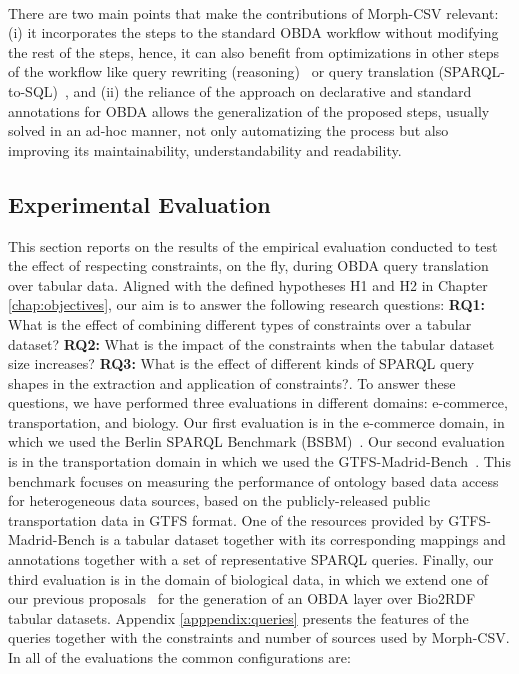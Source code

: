 \paragraph{}
There are two main points that make the contributions of Morph-CSV relevant: (i) it incorporates the steps to the standard OBDA workflow without modifying the rest of the steps, hence, it can also benefit from optimizations in other steps of the workflow like query rewriting (reasoning)~\citep{mora2014kyrie2} or query translation (SPARQL-to-SQL)~\citep{priyatna2014formalisation}, and (ii) the reliance of the approach on declarative and standard annotations for OBDA allows the generalization of the proposed steps, usually solved in an ad-hoc manner, not only automatizing the process but also improving its maintainability, understandability and readability.




\subsection{Experimental Evaluation}

This section reports on the results of the empirical evaluation conducted to test the effect of respecting constraints, on the fly, during OBDA query translation over tabular data. Aligned with the defined hypotheses H1 and H2 in Chapter \ref{chap:objectives}, our aim is to answer the following research questions: \textbf{RQ1:} What is the effect of combining different types of constraints over a tabular dataset? \textbf{RQ2:} What is the impact of the constraints when the tabular dataset size increases? \textbf{RQ3:} What is the effect of different kinds of SPARQL query shapes in the extraction and application of constraints?. To answer these questions, we have performed three evaluations in different domains: e-commerce, transportation, and biology. Our first evaluation is in the e-commerce domain, in which we used the Berlin SPARQL Benchmark (BSBM)~\citep{bizer2009berlin}. Our second evaluation is in the transportation domain in which we used the GTFS-Madrid-Bench~\citep{chaves2020gtfs}. This benchmark focuses on measuring the performance of ontology based data access for heterogeneous data sources, based on the publicly-released public transportation data in GTFS format. One of the resources provided by GTFS-Madrid-Bench is a tabular dataset together with its corresponding mappings and annotations together with a set of representative SPARQL queries. Finally, our third evaluation is in the domain of biological data, in which we extend one of our previous proposals~\citep{iglesias2019enhancing} for the generation of an OBDA layer over Bio2RDF tabular datasets. Appendix \ref{apppendix:queries} presents the features of the queries together with the constraints and number of sources used by Morph-CSV. In all of the evaluations the common configurations are:

